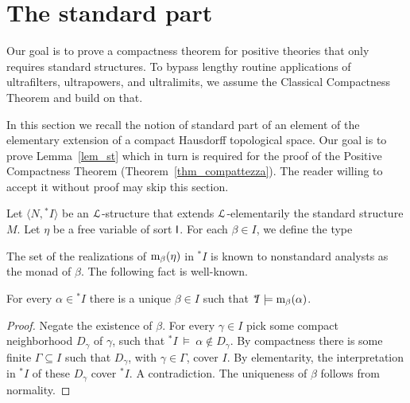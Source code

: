 \documentclass[10pt,oneside]{amsproc}
\renewcommand*{\emph}[1]{%
   \smash{\tikz[baseline]\node[rectangle, fill=teal!25, rounded corners, inner xsep=0.5ex, inner ysep=0.2ex, anchor=base, minimum height = 2.7ex]{\strut #1};}}
\begin{document}
\section{The standard part}\label{standard_part}

Our goal is to prove a compactness theorem for positive theories that only requires standard structures.
To bypass lengthy routine applications of ultrafilters, ultrapowers, and ultralimits, %
we assume the Classical Compactness Theorem and build on that.

In this section we recall the notion of standard part of an element of the elementary extension of a compact Hausdorff topological space.
Our goal is to prove Lemma~\ref{lem_st} which in turn is required for the proof of the Positive Compactness Theorem (Theorem~\ref{thm_compattezza}).
The reader willing to accept it without proof may skip this section.

Let $\langle N, {}^*\!\!I\rangle$ be an ${\EuScript L}$-structure that extends ${\EuScript L}$-elementarily the standard structure $M$. %
Let $\eta$ be a free variable of sort ${\sf I}$.
For each $\beta\in I$, we define the type


The set of the realizations of ${\rm m}_\beta(\eta)$ in ${}^*\!\!I$ is known to nonstandard analysts as the monad of $\beta$. 
The following fact is well-known.

\begin{fact}\label{fact_uniqueness_st}
  For every $\alpha\in{}^*\!\!I$ there is a unique $\beta\in I$ such that ${}^*\!\!I\models{\rm m}_\beta(\alpha)$.
\end{fact}

\begin{proof}
  Negate the existence of $\beta$.
  For every $\gamma\in I$ pick some compact neighborhood $D_\gamma$ of $\gamma$, such that ${}^*\!\!I\ \models\ \alpha\notin D_\gamma$.
  By compactness there is some finite $\Gamma\subseteq I$ such that $D_\gamma$, with $\gamma\in\Gamma$, cover $I$.
  By elementarity, the interpretation in ${}^*\!\!I$ of these $D_{\gamma}$ cover ${}^*\!\!I$.
  A contradiction.
  The uniqueness of $\beta$ follows from normality.
\end{proof}
\end{document}
